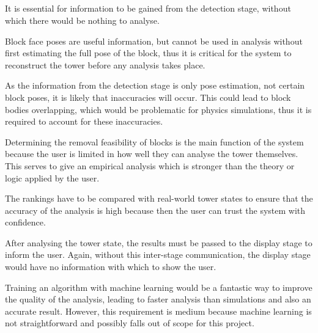 \begin{enumerate}
\section{\analysis}

It is essential for information to be gained from the detection stage, without which there would be nothing to analyse.

Block face poses are useful information, but cannot be used in analysis without first estimating the full pose of the block, thus it is critical for the system to reconstruct the tower before any analysis takes place.

As the information from the detection stage is only pose estimation, not certain block poses, it is likely that inaccuracies will occur. This could lead to block bodies overlapping, which would be problematic for physics simulations, thus it is required to account for these inaccuracies.

Determining the removal feasibility of blocks is the main function of the system because the user is limited in how well they can analyse the tower themselves. This serves to give an empirical analysis which is stronger than the theory or logic applied by the user.

The rankings have to be compared with real-world tower states to ensure that the accuracy of the analysis is high because then the user can trust the system with confidence.

After analysing the tower state, the results must be passed to the display stage to inform the user. Again, without this inter-stage communication, the display stage would have no information with which to show the user.

Training an algorithm with machine learning would be a fantastic way to improve the quality of the analysis, leading to faster analysis than simulations and also an accurate result. However, this requirement is medium because machine learning is not straightforward and possibly falls out of scope for this project.


\end{enumerate}
